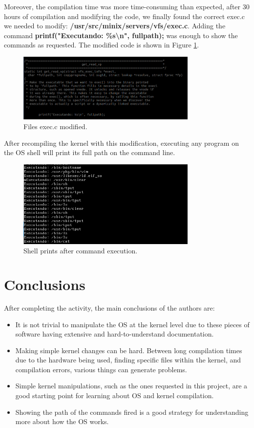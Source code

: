 \noindent Moreover, the compilation time was more time-consuming than expected, after 30 hours of compilation and modifying the code, we finally found the correct exec.c we needed to modify: \textbf{/usr/src/minix/servers/vfs/exec.c}. Adding the command \textbf{printf("Executando: \%s\textbackslash n", fullpath);} was enough to show the commands as requested. The modified code is shown in Figure \ref{fig-exec-mod}.

\begin{figure}[htbp]
\centering
\includegraphics[width=3.5in]{photo/exec_c_modified.png}
\caption{Files exec.c modified.}
\label{fig-exec-mod}
\end{figure}

After recompiling the kernel with this modification, executing any program on the OS shell will print its full path on the command line. 

\begin{figure}[htbp]
\centering
\includegraphics[width=3.5in]{photo/exec_c_prints.png}
\caption{Shell prints after command execution.}
\label{fig-exec-print}
\end{figure}

\newpage

\section{Conclusions}
After completing the activity, the main conclusions of the authors are:
\begin{itemize}
    \item It is not trivial to manipulate the OS at the kernel level due to these pieces of software having extensive and hard-to-understand documentation.
    \item Making simple kernel changes can be hard. Between long compilation times due to the hardware being used, finding specific files within the kernel, and compilation errors, various things can generate problems.
    \item Simple kernel manipulations, such as the ones requested in this project, are a good starting point for learning about OS and kernel compilation.
    \item 
    Showing the path of the commands fired is a good strategy for understanding more about how the OS works.
\end{itemize}

